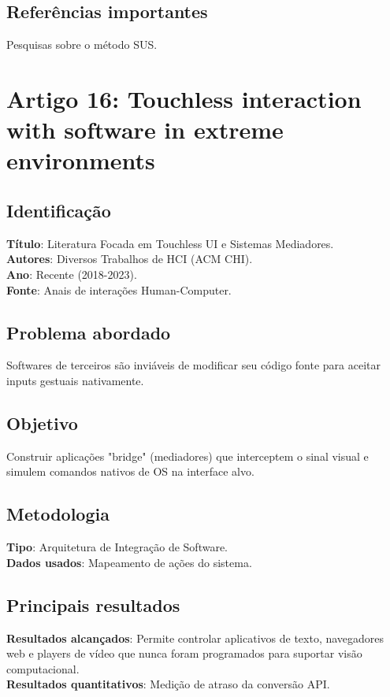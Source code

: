 \documentclass[12pt, a4paper]{article}
\begin{document}
\subsection{Referências importantes}
Pesquisas sobre o método SUS.
\newpage

\section{Artigo 16: Touchless interaction with software in extreme environments}
\subsection{Identificação}
\textbf{Título}: Literatura Focada em Touchless UI e Sistemas Mediadores.\\
\textbf{Autores}: Diversos Trabalhos de HCI (ACM CHI).\\
\textbf{Ano}: Recente (2018-2023).\\
\textbf{Fonte}: Anais de interações Human-Computer.\\
\subsection{Problema abordado}
Softwares de terceiros são inviáveis de modificar seu código fonte para aceitar inputs gestuais nativamente.\\
\subsection{Objetivo}
Construir aplicações "bridge" (mediadores) que interceptem o sinal visual e simulem comandos nativos de OS na interface alvo.\\
\subsection{Metodologia}
\textbf{Tipo}: Arquitetura de Integração de Software.\\
\textbf{Dados usados}: Mapeamento de ações do sistema.\\
\subsection{Principais resultados}
\textbf{Resultados alcançados}: Permite controlar aplicativos de texto, navegadores web e players de vídeo que nunca foram programados para suportar visão computacional.\\
\textbf{Resultados quantitativos}: Medição de atraso da conversão API.\\
\end{document}
